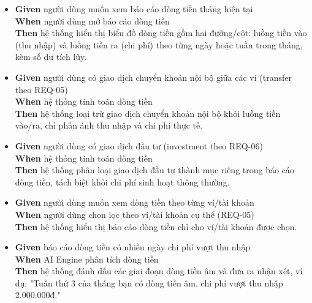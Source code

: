 \begin{itemize}
\item \textbf{Given} người dùng muốn xem báo cáo dòng tiền tháng hiện tại  \\ \hspace*{1.5em}  \textbf{When} người dùng mở báo cáo dòng tiền  \\ \hspace*{1.5em}  \textbf{Then} hệ thống hiển thị biểu đồ dòng tiền gồm hai đường/cột: luồng tiền vào (thu nhập) và luồng tiền ra (chi phí) theo từng ngày hoặc tuần trong tháng, kèm số dư tích lũy.
\item \textbf{Given} người dùng có giao dịch chuyển khoản nội bộ giữa các ví (transfer theo REQ-05)  \\ \hspace*{1.5em}  \textbf{When} hệ thống tính toán dòng tiền  \\ \hspace*{1.5em}  \textbf{Then} hệ thống loại trừ giao dịch chuyển khoản nội bộ khỏi luồng tiền vào/ra, chỉ phản ánh thu nhập và chi phí thực tế.
\item \textbf{Given} người dùng có giao dịch đầu tư (investment theo REQ-06)  \\ \hspace*{1.5em}  \textbf{When} hệ thống tính toán dòng tiền  \\ \hspace*{1.5em}  \textbf{Then} hệ thống phân loại giao dịch đầu tư thành mục riêng trong báo cáo dòng tiền, tách biệt khỏi chi phí sinh hoạt thông thường.
\item \textbf{Given} người dùng muốn xem dòng tiền theo từng ví/tài khoản  \\ \hspace*{1.5em}  \textbf{When} người dùng chọn lọc theo ví/tài khoản cụ thể (REQ-05)  \\ \hspace*{1.5em}  \textbf{Then} hệ thống hiển thị báo cáo dòng tiền chỉ cho ví/tài khoản được chọn.
\item \textbf{Given} báo cáo dòng tiền có nhiều ngày chi phí vượt thu nhập  \\ \hspace*{1.5em}  \textbf{When} AI Engine phân tích dòng tiền  \\ \hspace*{1.5em}  \textbf{Then} hệ thống đánh dấu các giai đoạn dòng tiền âm và đưa ra nhận xét, ví dụ: "Tuần thứ 3 của tháng bạn có dòng tiền âm, chi phí vượt thu nhập 2.000.000đ."

\end{itemize}
